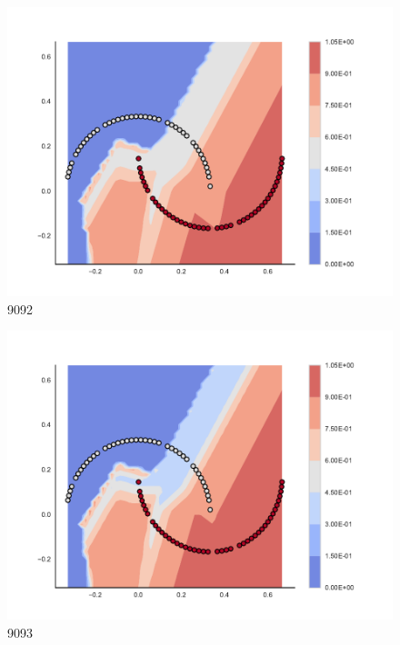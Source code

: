 \begin{subfigure}[b]{0.09\textwidth}
    \includegraphics[clip, trim=2.35cm 1.75cm 4.5cm 0cm,width=\textwidth]{img/convergence/9092.pdf}
    \caption{9092}
    \label{fig:convergence_9092}
\end{subfigure}
%
\begin{subfigure}[b]{0.09\textwidth}
    \includegraphics[clip, trim=2.35cm 1.75cm 4.5cm 0cm,width=\textwidth]{img/convergence/9093.pdf}
    \caption{9093}
    \label{fig:convergence_9093}
\end{subfigure}
%
